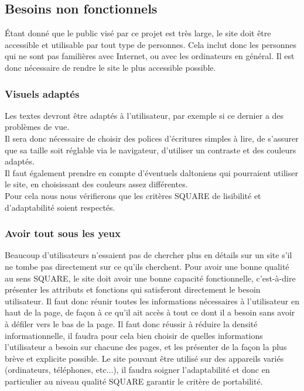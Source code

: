 \documentclass[a4paper,11pt]{article}
\begin{document}
\subsection{Besoins non fonctionnels}

Étant donné que le public visé par ce projet est très large, le site doit être accessible et utilisable par
tout type de personnes. Cela inclut donc les personnes qui ne sont pas familières avec Internet, ou
avec les ordinateurs en général. Il est donc nécessaire de rendre le site le plus accessible possible.\\

\subsubsection{Visuels adaptés}

Les textes devront être adaptés à l’utilisateur, par exemple si ce dernier a des problèmes de vue.\\

Il sera donc nécessaire de choisir des polices d’écritures simples à lire, de s’assurer que sa taille soit
réglable via le navigateur, d’utiliser un contraste et des couleurs adaptés.\\

Il faut également prendre en compte d’éventuels daltoniens qui pourraient utiliser le site, en
choisissant des couleurs assez différentes.\\

Pour cela nous nous vérifierons que les critères SQUARE de lisibilité et d’adaptabilité soient respectés.\\

\subsubsection{Avoir tout sous les yeux}

Beaucoup d’utilisateurs n’essaient pas de chercher plus en détails sur un site s’il ne tombe pas
directement sur ce qu’ils cherchent. Pour avoir une bonne qualité au sens SQUARE, le site doit avoir
une bonne capacité fonctionnelle, c'est-à-dire présenter les attributs et fonctions qui satisferont
directement le besoin utilisateur. Il faut donc réunir toutes les informations nécessaires à l’utilisateur
en haut de la page, de façon à ce qu’il ait accès à tout ce dont il a besoin sans avoir à défiler vers le
bas de la page. Il faut donc réussir à réduire la densité informationnelle, il faudra pour cela bien choisir
de quelles informations l’utilisateur a besoin sur chacune des pages, et les présenter de la façon la
plus brève et explicite possible. Le site pouvant être utilisé sur des appareils variés (ordinateurs,
téléphones, etc...), il faudra soigner l’adaptabilité et donc en particulier au niveau qualité SQUARE
garantir le critère de portabilité.\\
\end{document}
